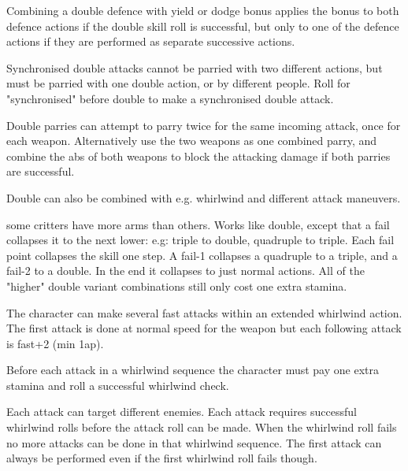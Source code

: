 Combining a double defence with yield or dodge bonus applies the bonus to both defence actions if the double skill roll is successful, but only to one of the defence actions if they are performed as separate successive actions.

Synchronised double attacks cannot be parried with two different actions, but must be parried with one double action, or by different people. Roll for "synchronised" before double to make a synchronised double attack.

Double parries can attempt to parry twice for the same incoming attack, once for each weapon. Alternatively use the two weapons as one combined parry, and combine the abs of both weapons to block the attacking damage if both parries are successful.

Double can also be combined with e.g. whirlwind and different attack maneuvers.



 some critters have more arms than others. Works like double, except that a fail collapses it to the next lower: e.g: triple to double, quadruple to triple. Each fail point collapses the skill one step. A fail-1 collapses a quadruple to a triple, and a fail-2 to a double. In the end it collapses to just normal actions. All of the "higher" double variant combinations still only cost one extra stamina.


 The character can make several fast attacks within an extended whirlwind action. The first attack is done at normal speed for the weapon but each following attack is fast+2 (min 1ap).

Before each attack in a whirlwind sequence the character must pay one extra stamina and roll a successful whirlwind check.

Each attack can target different enemies. Each attack requires successful whirlwind rolls before the attack roll can be made. When the whirlwind roll fails no more attacks can be done in that whirlwind sequence. The first attack can always be performed even if the first whirlwind roll fails though.

